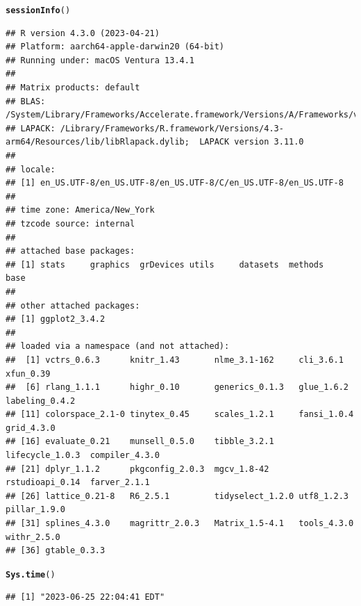 \documentclass{article}\usepackage[]{graphicx}\usepackage[]{xcolor}
\makeatletter
\newcommand{\hlstd}[1]{\textcolor[rgb]{0.345,0.345,0.345}{#1}}%
\newcommand{\hlkwd}[1]{\textcolor[rgb]{0.737,0.353,0.396}{\textbf{#1}}}%
\newenvironment{kframe}{%
 \def\at@end@of@kframe{}%
 \ifinner\ifhmode%
  \def\at@end@of@kframe{\end{minipage}}%
  \begin{minipage}{\columnwidth}%
 \fi\fi%
 \def\FrameCommand##1{\hskip\@totalleftmargin \hskip-\fboxsep
 \colorbox{shadecolor}{##1}\hskip-\fboxsep
     \hskip-\linewidth \hskip-\@totalleftmargin \hskip\columnwidth}%
 \MakeFramed {\advance\hsize-\width
   \@totalleftmargin\z@ \linewidth\hsize
   \@setminipage}}%
 {\par\unskip\endMakeFramed%
 \at@end@of@kframe}
\newenvironment{knitrout}{}{} %
\makeatother
\begin{document}
\begin{knitrout}
\color{fgcolor}\begin{kframe}
\begin{alltt}
\hlkwd{sessionInfo}\hlstd{()}
\end{alltt}
\begin{verbatim}
## R version 4.3.0 (2023-04-21)
## Platform: aarch64-apple-darwin20 (64-bit)
## Running under: macOS Ventura 13.4.1
## 
## Matrix products: default
## BLAS:   /System/Library/Frameworks/Accelerate.framework/Versions/A/Frameworks/vecLib.framework/Versions/A/libBLAS.dylib 
## LAPACK: /Library/Frameworks/R.framework/Versions/4.3-arm64/Resources/lib/libRlapack.dylib;  LAPACK version 3.11.0
## 
## locale:
## [1] en_US.UTF-8/en_US.UTF-8/en_US.UTF-8/C/en_US.UTF-8/en_US.UTF-8
## 
## time zone: America/New_York
## tzcode source: internal
## 
## attached base packages:
## [1] stats     graphics  grDevices utils     datasets  methods   base     
## 
## other attached packages:
## [1] ggplot2_3.4.2
## 
## loaded via a namespace (and not attached):
##  [1] vctrs_0.6.3      knitr_1.43       nlme_3.1-162     cli_3.6.1        xfun_0.39       
##  [6] rlang_1.1.1      highr_0.10       generics_0.1.3   glue_1.6.2       labeling_0.4.2  
## [11] colorspace_2.1-0 tinytex_0.45     scales_1.2.1     fansi_1.0.4      grid_4.3.0      
## [16] evaluate_0.21    munsell_0.5.0    tibble_3.2.1     lifecycle_1.0.3  compiler_4.3.0  
## [21] dplyr_1.1.2      pkgconfig_2.0.3  mgcv_1.8-42      rstudioapi_0.14  farver_2.1.1    
## [26] lattice_0.21-8   R6_2.5.1         tidyselect_1.2.0 utf8_1.2.3       pillar_1.9.0    
## [31] splines_4.3.0    magrittr_2.0.3   Matrix_1.5-4.1   tools_4.3.0      withr_2.5.0     
## [36] gtable_0.3.3
\end{verbatim}
\begin{alltt}
\hlkwd{Sys.time}\hlstd{()}
\end{alltt}
\begin{verbatim}
## [1] "2023-06-25 22:04:41 EDT"
\end{verbatim}
\end{kframe}
\end{knitrout}
\end{document}
